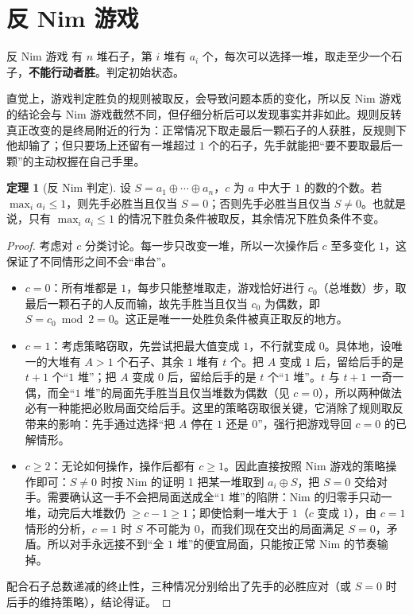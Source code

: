 \documentclass[UTF8,a4paper,11pt,oneside,openany,fontset=fandol]{ctexbook}
\theoremstyle{definition}
\newtheorem{theorem}[definition]{定理}
\begin{document}
\section{反 Nim 游戏}
\begin{problem}{反 Nim 游戏}
有 $n$ 堆石子，第 $i$ 堆有 $a_i$ 个，每次可以选择一堆，取走至少一个石子，\textbf{不能行动者胜}。判定初始状态。
\end{problem}

直觉上，游戏判定胜负的规则被取反，会导致问题本质的变化，所以反 Nim 游戏的结论会与 Nim 游戏截然不同，但仔细分析后可以发现事实并非如此。规则反转真正改变的是终局附近的行为：正常情况下取走最后一颗石子的人获胜，反规则下他却输了；但只要场上还留有一堆超过 $1$ 个的石子，先手就能把“要不要取最后一颗”的主动权握在自己手里。

\begin{theorem}[反 Nim 判定]\label{thm:antinim}
设 $S=a_1\oplus\cdots\oplus a_n$，$c$ 为 $a$ 中大于 $1$ 的数的个数。若 $\max_i a_i\le1$，则先手必胜当且仅当 $S=0$；否则先手必胜当且仅当 $S\ne0$。也就是说，只有 $\max_i a_i\le1$ 的情况下胜负条件被取反，其余情况下胜负条件不变。
\end{theorem}
\begin{proof}
考虑对 $c$ 分类讨论。每一步只改变一堆，所以一次操作后 $c$ 至多变化 $1$，这保证了不同情形之间不会“串台”。
\begin{itemize}
\item $c=0$：所有堆都是 $1$，每步只能整堆取走，游戏恰好进行 $c_0$（总堆数）步，取最后一颗石子的人反而输，故先手胜当且仅当 $c_0$ 为偶数，即 $S=c_0\bmod 2=0$。这正是唯一一处胜负条件被真正取反的地方。
\item $c=1$：考虑策略窃取，先尝试把最大值变成 $1$，不行就变成 $0$。具体地，设唯一的大堆有 $A>1$ 个石子、其余 $1$ 堆有 $t$ 个。把 $A$ 变成 $1$ 后，留给后手的是 $t+1$ 个“$1$ 堆”；把 $A$ 变成 $0$ 后，留给后手的是 $t$ 个“$1$ 堆”。$t$ 与 $t+1$ 一奇一偶，而全“$1$ 堆”的局面先手胜当且仅当堆数为偶数（见 $c=0$），所以两种做法必有一种能把必败局面交给后手。这里的策略窃取很关键，它消除了规则取反带来的影响：先手通过选择“把 $A$ 停在 $1$ 还是 $0$”，强行把游戏导回 $c=0$ 的已解情形。
\item $c\ge2$：无论如何操作，操作后都有 $c\ge1$。因此直接按照 Nim 游戏的策略操作即可：$S\ne0$ 时按 Nim 的证明 1 把某一堆取到 $a_i\oplus S$，把 $S=0$ 交给对手。需要确认这一手不会把局面送成全“$1$ 堆”的陷阱：Nim 的归零手只动一堆，动完后大堆数仍 $\ge c-1\ge1$；即使恰剩一堆大于 $1$（$c$ 变成 $1$），由 $c=1$ 情形的分析，$c=1$ 时 $S$ 不可能为 $0$，而我们现在交出的局面满足 $S=0$，矛盾。所以对手永远接不到“全 $1$ 堆”的便宜局面，只能按正常 Nim 的节奏输掉。
\end{itemize}
配合石子总数递减的终止性，三种情况分别给出了先手的必胜应对（或 $S=0$ 时后手的维持策略），结论得证。
\end{proof}
\end{document}

